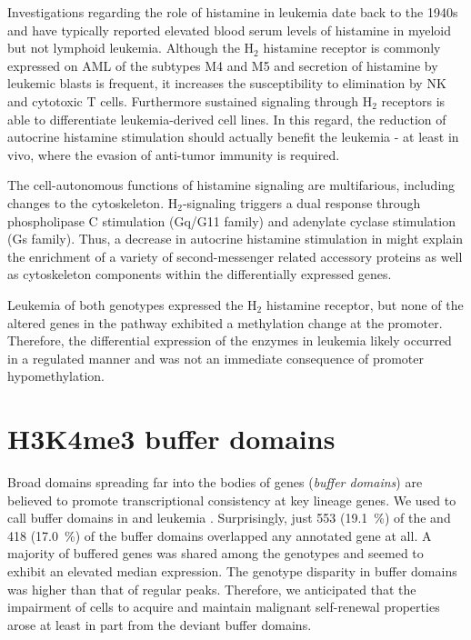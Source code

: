 Investigations regarding the role of histamine in leukemia date back to the 1940s and have typically reported elevated blood serum levels of histamine in myeloid but not lymphoid leukemia\cite{Valentine1950}. Although the H$_2$ histamine receptor is commonly expressed on AML of the subtypes M4 and M5 and secretion of histamine by leukemic blasts is frequent, it increases the susceptibility to elimination by NK and cytotoxic T cells\cite{Mellqvist2000,Aurelius2012}. Furthermore sustained signaling through H$_2$ receptors is able to differentiate leukemia-derived cell lines\cite{Monczor2016}. In this regard, the reduction of autocrine histamine stimulation should actually benefit the leukemia - at least in vivo, where the evasion of anti-tumor immunity is required.

The cell-autonomous functions of histamine signaling are multifarious, including changes to the cytoskeleton. H$_2$-signaling triggers a dual response through phospholipase C stimulation (Gq/G11 family) and adenylate cyclase stimulation (Gs family)\cite{Kuehn1996}. Thus, a decrease in autocrine histamine stimulation in \dnmtchip might explain the enrichment of a variety of second-messenger related accessory proteins as well as cytoskeleton components within the differentially expressed genes. 

Leukemia of both genotypes expressed the H$_2$ histamine receptor, but none of the altered genes in the  pathway exhibited a methylation change at the promoter. Therefore, the differential expression of the enzymes in \dnmtchip leukemia likely occurred in a regulated manner and was not an immediate consequence of promoter hypomethylation.   

\section{H3K4me3 buffer domains}
\label{chap:r:degenes:bufferdomains}

Broad \hisfourthree domains spreading far into the bodies of genes (\emph{buffer domains})  are believed to promote transcriptional consistency at key lineage genes\cite{Benayoun2014}.  We used \cite{Sicer,Xu2014} to call buffer domains in \dnmtwt and \dnmtchip leukemia \supple. Surprisingly, just \num{553} (\SI{19,1}{\percent}) of the \dnmtwt and \num{418} (\SI{17,0}{\percent}) of the \dnmtchip buffer domains overlapped any annotated gene at all. A majority of buffered genes was shared among the genotypes and seemed to exhibit an elevated median expression. The genotype disparity in buffer domains was higher than that of regular \hisfourthree peaks. Therefore, we anticipated that the impairment of \dnmtchip cells to acquire and maintain malignant self-renewal properties arose at least in part from the deviant buffer domains. 

